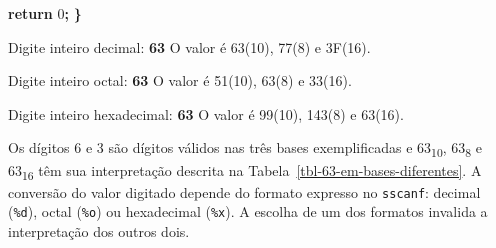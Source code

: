 \documentclass[
  11pt,
  a4paper,
]{scrbook}
\newenvironment{Shaded}{\begin{snugshade}}{\end{snugshade}}
\newcommand{\ControlFlowTok}[1]{\textcolor[rgb]{0.13,0.29,0.53}{\textbf{#1}}}
\newcommand{\DecValTok}[1]{\textcolor[rgb]{0.00,0.00,0.81}{#1}}
\newcommand{\KeywordTok}[1]{\textcolor[rgb]{0.13,0.29,0.53}{\textbf{#1}}}
\newcommand{\NormalTok}[1]{#1}
\newcommand{\OperatorTok}[1]{\textcolor[rgb]{0.81,0.36,0.00}{\textbf{#1}}}
\begin{document}
\begin{Shaded}
\begin{Highlighting}[]
    \ControlFlowTok{return} \DecValTok{0}\OperatorTok{;}
\OperatorTok{\}}
\end{Highlighting}
\end{Shaded}

\begin{Shaded}
\begin{Highlighting}[]
\NormalTok{Digite inteiro decimal: }\KeywordTok{ 63 }
\NormalTok{O valor é 63(10), 77(8) e 3F(16).}

\NormalTok{Digite inteiro octal: }\KeywordTok{ 63 }
\NormalTok{O valor é 51(10), 63(8) e 33(16).}

\NormalTok{Digite inteiro hexadecimal: }\KeywordTok{ 63 }
\NormalTok{O valor é 99(10), 143(8) e 63(16).}
\end{Highlighting}
\end{Shaded}

Os dígitos 6 e 3 são dígitos válidos nas três bases exemplificadas e
63\textsubscript{10}, 63\textsubscript{8} e 63\textsubscript{16} têm sua
interpretação descrita na Tabela~\ref{tbl-63-em-bases-diferentes}. A
conversão do valor digitado depende do formato expresso no
\texttt{sscanf}: decimal (\texttt{\%d}), octal (\texttt{\%o}) ou
hexadecimal (\texttt{\%x}). A escolha de um dos formatos invalida a
interpretação dos outros dois.
\end{document}
